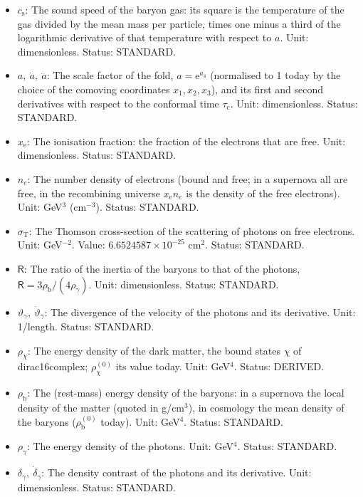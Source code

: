 \documentclass[
  10pt,
]{article}
\begin{document}
\begin{itemize}
\item
  \(c_{\mathrm{s}}\): The sound speed of the baryon gas: its square is
  the temperature of the gas divided by the mean mass per particle,
  times one minus a third of the logarithmic derivative of that
  temperature with respect to \(a\). Unit: dimensionless. Status:
  STANDARD.
\item
  \(a,\ \dot a,\ \ddot a\): The scale factor of the fold,
  \(a = \mathrm{e}^{a_4}\) (normalised to 1 today by the choice of the
  comoving coordinates \(x_1, x_2, x_3\)), and its first and second
  derivatives with respect to the conformal time \(\tau_{\mathrm{c}}\).
  Unit: dimensionless. Status: STANDARD.
\item
  \(x_{\mathrm{e}}\): The ionisation fraction: the fraction of the
  electrons that are free. Unit: dimensionless. Status: STANDARD.
\item
  \(n_e\): The number density of electrons (bound and free; in a
  supernova all are free, in the recombining universe
  \(x_{\mathrm{e}}n_e\) is the density of the free electrons). Unit:
  GeV\(^3\) (cm\(^{-3}\)). Status: STANDARD.
\item
  \(\sigma_{\mathrm{T}}\): The Thomson cross-section of the scattering
  of photons on free electrons. Unit: GeV\(^{-2}\). Value:
  \(6.6524587\times10^{-25}\) cm\(^2\). Status: STANDARD.
\item
  \(\mathsf{R}\): The ratio of the inertia of the baryons to that of the
  photons, \(\mathsf{R} = 3\rho_{\mathrm{b}}/(4\rho_\gamma)\). Unit:
  dimensionless. Status: STANDARD.
\item
  \(\vartheta_\gamma,\ \dot\vartheta_\gamma\): The divergence of the
  velocity of the photons and its derivative. Unit: 1/length. Status:
  STANDARD.
\item
  \(\rho_\chi\): The energy density of the dark matter, the bound states
  \(\chi\) of dirac16complex; \(\rho_\chi^{(0)}\) its value today. Unit:
  GeV\(^4\). Status: DERIVED.
\item
  \(\rho_{\mathrm{b}}\): The (rest-mass) energy density of the baryons:
  in a supernova the local density of the matter (quoted in g/cm\(^3\)),
  in cosmology the mean density of the baryons
  (\(\rho_{\mathrm{b}}^{(0)}\) today). Unit: GeV\(^4\). Status:
  STANDARD.
\item
  \(\rho_\gamma\): The energy density of the photons. Unit: GeV\(^4\).
  Status: STANDARD.
\item
  \(\delta_\gamma,\ \dot\delta_\gamma\): The density contrast of the
  photons and its derivative. Unit: dimensionless. Status: STANDARD.

\end{itemize}
\end{document}
